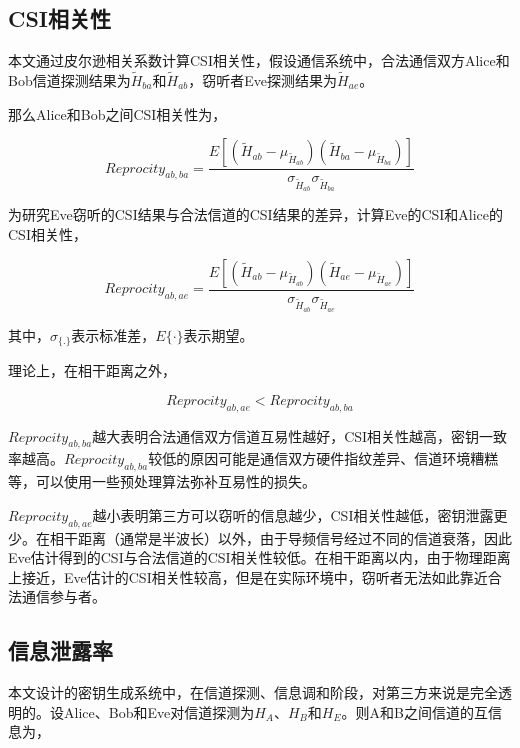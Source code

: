 \documentclass[master]{seuthesis} %
\begin{document}
\begin{Main}
\subsection{CSI相关性}

本文通过皮尔逊相关系数计算CSI相关性，假设通信系统中，合法通信双方Alice和Bob信道探测结果为$\tilde{H}_{ba}$和$\tilde{H}_{ab}$，窃听者Eve探测结果为$\tilde{H}_{ae}$。

那么Alice和Bob之间CSI相关性为，

\begin{equation}\label{equation_corr_ab}
    Reprocity_{ab, ba} = \frac{E[(\tilde{H}_{ab}-\mu_{\tilde{H}_{ab}})(\tilde{H}_{ba}-\mu_{\tilde{H}_{ba}})]}{\sigma_{\tilde{H}_{ab}}\sigma_{\tilde{H}_{ba}}}
\end{equation}

为研究Eve窃听的CSI结果与合法信道的CSI结果的差异，计算Eve的CSI和Alice的CSI相关性，

\begin{equation}\label{equation_corr_ae}
    Reprocity_{ab, ae} = \frac{E[(\tilde{H}_{ab}-\mu_{\tilde{H}_{ab}})(\tilde{H}_{ae}-\mu_{\tilde{H}_{ae}})]}{\sigma_{\tilde{H}_{ab}}\sigma_{\tilde{H}_{ae}}}
\end{equation}

其中，$\sigma_{\{.\}}$表示标准差，$E\{\cdot\}$表示期望。

理论上，在相干距离之外，

\begin{equation}
    Reprocity_{ab, ae} < Reprocity_{ab, ba}
\end{equation}

$Reprocity_{ab, ba}$越大表明合法通信双方信道互易性越好，CSI相关性越高，密钥一致率越高。$Reprocity_{ab, ba}$较低的原因可能是通信双方硬件指纹差异、信道环境糟糕等，可以使用一些预处理算法弥补互易性的损失。

$Reprocity_{ab, ae}$越小表明第三方可以窃听的信息越少，CSI相关性越低，密钥泄露更少。在相干距离（通常是半波长）以外，由于导频信号经过不同的信道衰落，因此Eve估计得到的CSI与合法信道的CSI相关性较低。在相干距离以内，由于物理距离上接近，Eve估计的CSI相关性较高，但是在实际环境中，窃听者无法如此靠近合法通信参与者。

\subsection{信息泄露率}

本文设计的密钥生成系统中，在信道探测、信息调和阶段，对第三方来说是完全透明的\cite{sahin2016secure}。设Alice、Bob和Eve对信道探测为$H_A$、$H_B$和$H_E$。则A和B之间信道的互信息为，


\end{Main}
\end{document}
